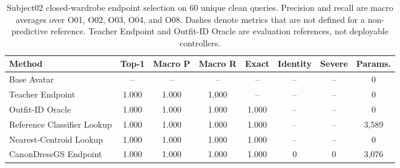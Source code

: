 \begin{table}[t]
\centering
\small
\begin{tabular*}{\textwidth}{@{\extracolsep{\fill}}lccccccc@{}}
\toprule
Method & Top-1 & Macro P & Macro R & Exact & Identity & Severe & Params. \\
\midrule
Base Avatar & -- & -- & -- & -- & -- & -- & 0 \\
Teacher Endpoint & 1.000 & 1.000 & 1.000 & -- & -- & -- & 0 \\
Outfit-ID Oracle & 1.000 & 1.000 & 1.000 & 1.000 & -- & -- & 0 \\
Reference Classifier Lookup & 1.000 & 1.000 & 1.000 & 1.000 & -- & -- & 3,589 \\
Nearest-Centroid Lookup & 1.000 & 1.000 & 1.000 & 1.000 & -- & -- & 0 \\
CanonDressGS Endpoint & 1.000 & 1.000 & 1.000 & 1.000 & 0 & 0 & 3,076 \\
\bottomrule
\end{tabular*}
\caption{Subject02 closed-wardrobe endpoint selection on 60 unique clean queries. Precision and recall are macro averages over O01, O02, O03, O04, and O08. Dashes denote metrics that are not defined for a non-predictive reference. Teacher Endpoint and Outfit-ID Oracle are evaluation references, not deployable controllers.}
\label{tab:endpoint-selection}
\end{table}
